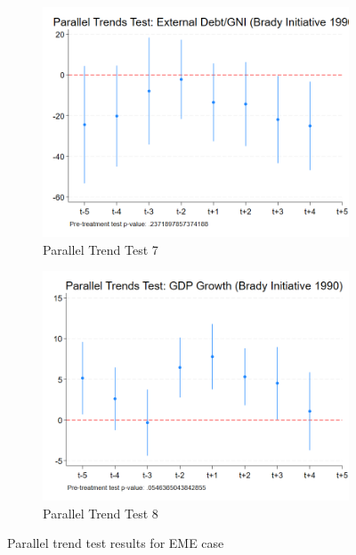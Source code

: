 \begin{figure}[ht!]
\begin{subfigure}[b]{0.48\textwidth}
        \includegraphics[width=\textwidth]{figures/PT_Brady_ExtDebt.png}
        \caption{Parallel Trend Test 7}
        \label{fig:pt7_eme}
    \end{subfigure}
    \hfill
    \begin{subfigure}[b]{0.48\textwidth}
        \centering
        \includegraphics[width=\textwidth]{figures/PT_Brady_GDP.png}
        \caption{Parallel Trend Test 8}
        \label{fig:pt8_eme}
    \end{subfigure}
    \caption{Parallel trend test results for EME case}
    \label{fig:parallel_trends3}
\end{figure}

